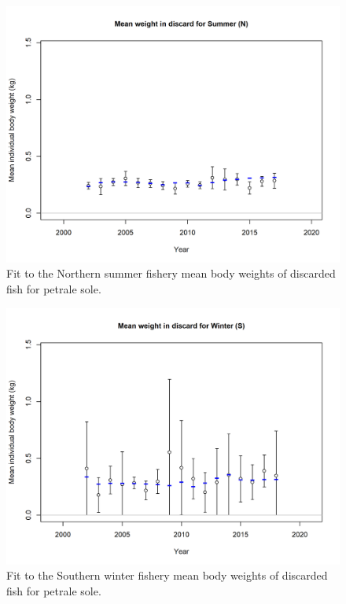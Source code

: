\documentclass[12pt,]{article}
\begin{document}
\FloatBarrier

\begin{figure}
\centering
\includegraphics{r4ss/plots_mod1/bodywt_fit_fltSummer (N).png}
\caption{Fit to the Northern summer fishery mean body weights of
discarded fish for petrale sole. \label{fig:ns_bodywt_fit}}
\end{figure}

\FloatBarrier

\begin{figure}
\centering
\includegraphics{r4ss/plots_mod1/bodywt_fit_fltWinter (S).png}
\caption{Fit to the Southern winter fishery mean body weights of
discarded fish for petrale sole. \label{fig:sw_bodywt_fit}}
\end{figure}
\end{document}
